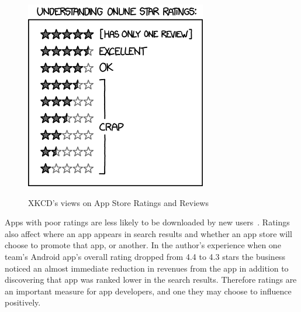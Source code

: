 \begin{figure}
\begin{minipage}{.5\textwidth}
  \centering
  \includegraphics[width=\textwidth]{images/xkcd/star_ratings.png}
  \label{fig:xkcd-star-ratings}
\end{minipage}
    \caption{XKCD's views on App Store Ratings and Reviews}
    \label{fig:xkcd-app-store-ratings}
\end{figure}
\afterpage{\clearpage}

Apps with poor ratings are less likely to be downloaded by new users~. Ratings also affect where an app appears in search results and whether an app store will choose to promote that app, or another. In the author's experience when one team's Android app's overall rating dropped from 4.4 to 4.3 stars the business noticed an almost immediate reduction in revenues from the app in addition to discovering that app was ranked lower in the search results. Therefore ratings are an important measure for app developers, and one they may choose to influence positively. 

